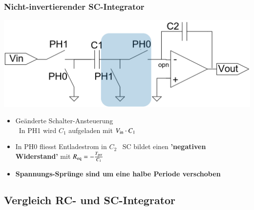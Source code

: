 \subsubsection{Nicht-invertierender SC-Integrator}

\begin{minipage}[c]{0.4\columnwidth}
    \includegraphics[width=\columnwidth]{images/nicht-invertierender_sc_integrator.png}
\end{minipage}
\hfill
\begin{minipage}[c]{0.58\columnwidth}
    \begin{itemize}
        \item Geänderte Schalter-Ansteuerung \\
            \textrightarrow\ In PH1 wird $C_1$ aufgeladen mit $V_{\rm in} \cdot C_1$
        \item In PH0 fliesst Entladestrom in $C_2$ \textrightarrow\ SC bildet einen \textbf{'negativen Widerstand'} 
            mit $R_{\rm eq} = - \frac{T_{\rm per}}{C_1}$ 
        \item \textbf{Spannungs-Sprünge sind um eine halbe Periode verschoben} 
    \end{itemize}
\end{minipage}


\subsection{Vergleich RC- und SC-Integrator}

